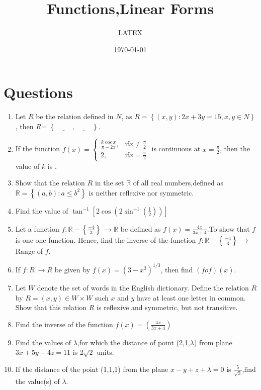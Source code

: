 \documentclass[12pt,-letter paper]{article}
\title{Functions,Linear Forms}
\date{\today}
\providecommand{\cbrak}[1]{\ensuremath{\left\{#1\right\}}}
\providecommand{\sbrak}[1]{\ensuremath{{}\left[#1\right]}}
\providecommand{\brak}[1]{\ensuremath{\left(#1\right)}}
\begin{document}
\author{LATEX}
\maketitle

\section*{Questions}
\begin{enumerate}
\item Let $R$ be the relation defined in $N$, as
$R = \cbrak{(x, y) : 2x + 3y = 15, x, y \in N}$, then $R$=  \cbrak{\underline{\hspace{1cm}},\underline{\hspace{1cm}}}.
\item If the function $f(x)=\begin{cases}\frac{k\cos{x}}{\pi - 2x}, & \text{if} x \neq \frac{\pi}{2}\\\text{2},&\text{if} x=\frac{\pi}{2}\end{cases}$  is continuous  at $x=\frac{\pi}{2}$, then the value of $k$ is {\underline{\hspace{1cm}}}.
\item Show that the relation $R$ in the set $\mathbb{R}$ of all real numbers,defined as $\mathbb{R}=\cbrak{(a, b) : a \leq b^2}$ is neither reflexive nor symmetric.
\item Find the value of $\tan^{-1}\sbrak{{2\cos}\brak{2 \sin^{-1}\brak{\frac{1}{2}}}}$
\item Let a function $f:\mathbb{R}-\cbrak{\frac{-4}{3}}\ \to \mathbb{R}$ be defined as $f(x)=\frac{4x}{3x+4}$.To show that $f$ is one-one function. Hence, find the inverse of the function $f:\mathbb{R}-\cbrak{\frac{-4}{3}} \ \to$ Range\hspace{0.25em} of $f$.
\item If $f:R\ \to R$ be given by $f(x)=\brak{3-x^3}^{1/3}$, then find $\brak{fof}\brak{x}$.
\item Let $W$ denote the set of words in the English dictionary. Define the relation $R$ by
$R={\brak{x,y}}\in W \times W$  such $x$ and $y$ have at least one letter in common. Show that this relation $R$ is reflexive and symmetric, but not transitive.
\item Find the inverse of the function $f(x)=\brak{\frac{4x}{3x+4}}$
\item Find the values of $\lambda$,for which the distance of point (2,1,$\lambda$) from plane $3x+5y+4z=11$ is 2$\sqrt{2}$ units.
\item If the distance of the point (1,1,1) from the plane $x-y+z+\lambda=0$ is $\frac{5}{\sqrt{3}}$,find the value(s) of $\lambda$.

\end{enumerate}
\end{document}
